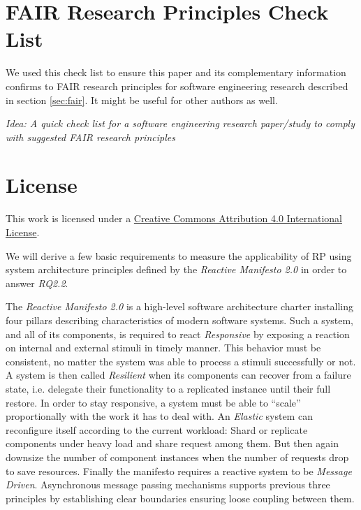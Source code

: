 \documentclass[12pt,a4paper]{article}
\begin{document}
\appendix
\section{FAIR Research Principles Check List}

We used this check list to ensure this paper and its complementary information confirms to FAIR research principles for software engineering research described in section \ref{sec:fair}. It might be useful for other authors as well.

\emph{Idea: A quick check list for a software engineering research paper/study to comply with suggested FAIR research principles}




\section*{License}
\ccby\thinspace\thinspace This work is licensed under a \href{https://creativecommons.org/licenses/by/4.0/}{Creative Commons Attribution 4.0 International License}.



We will derive a few basic requirements to measure the applicability of RP using system architecture principles defined by the \emph{Reactive Manifesto 2.0} \cite{reactivemanifesto} in order to answer \emph{RQ2.2}.

The \emph{Reactive Manifesto 2.0} \cite{reactivemanifesto} is a high-level software architecture charter installing four pillars describing characteristics of modern software systems. Such a system, and all of its components, is required to react \emph{Responsive} by exposing a reaction on internal and external stimuli in timely manner. This behavior must be consistent, no matter the system was able to process a stimuli successfully or not. A system is then called \emph{Resilient} when its components can recover from a failure state, i.e. delegate their functionality to a replicated instance until their full restore. In order to stay responsive, a system must be able to ``scale'' proportionally with the work it has to deal with. An \emph{Elastic} system can reconfigure itself according to the current workload: Shard or replicate components under heavy load and share request among them. But then again downsize the number of component instances when the number of requests drop to save resources. Finally the manifesto requires a reactive system to be \emph{Message Driven}. Asynchronous message passing mechanisms supports previous three principles by establishing clear boundaries ensuring loose coupling between them.
\end{document}
